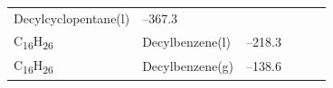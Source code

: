 \documentclass[
  9pt,
]{extbook}
\theoremstyle{definition}
\theoremstyle{definition}
\theoremstyle{definition}
\theoremstyle{remark}
\begin{document}
\begin{longtable}[]{@{}llllll@{}}
\begin{minipage}[t]{0.17\columnwidth}
Decylcyclopentane(l)\strut
\end{minipage} & \begin{minipage}[t]{0.15\columnwidth}\raggedright
--367.3\strut
\end{minipage} & \begin{minipage}[t]{0.15\columnwidth}\raggedright
\strut
\end{minipage} & \begin{minipage}[t]{0.14\columnwidth}\raggedright
\strut
\end{minipage} & \begin{minipage}[t]{0.14\columnwidth}\raggedright
\strut
\end{minipage}\tabularnewline
\begin{minipage}[t]{0.07\columnwidth}\raggedright
C\textsubscript{16}H\textsubscript{26}\strut
\end{minipage} & \begin{minipage}[t]{0.17\columnwidth}\raggedright
Decylbenzene(l)\strut
\end{minipage} & \begin{minipage}[t]{0.15\columnwidth}\raggedright
--218.3\strut
\end{minipage} & \begin{minipage}[t]{0.15\columnwidth}\raggedright
\strut
\end{minipage} & \begin{minipage}[t]{0.14\columnwidth}\raggedright
\strut
\end{minipage} & \begin{minipage}[t]{0.14\columnwidth}\raggedright
\strut
\end{minipage}\tabularnewline
\begin{minipage}[t]{0.07\columnwidth}\raggedright
C\textsubscript{16}H\textsubscript{26}\strut
\end{minipage} & \begin{minipage}[t]{0.17\columnwidth}\raggedright
Decylbenzene(g)\strut
\end{minipage} & \begin{minipage}[t]{0.15\columnwidth}\raggedright
--138.6\strut
\end{minipage} & \begin{minipage}[t]{0.15\columnwidth}\raggedright
\strut
\end{minipage} & \begin{minipage}[t]{0.14\columnwidth}\raggedright
\strut
\end{minipage} & \begin{minipage}[t]{0.14\columnwidth}\raggedright

\end{minipage}
\end{longtable}
\end{document}
